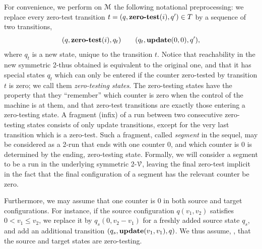 For convenience, we perform on $\mathcal{M}$ the following notational
preprocessing:
we replace every zero-test transition
$t=(q,\textbf{zero-test}(i), q')\in T$ by a sequence of two transitions,
\[
(q, \textbf{zero-test}(i), q_t) \qquad
(q_t, \textbf{update}(0,0), q'),
\]
where $q_t$ is a new state, unique to the transition $t$.
Notice that reachability in the new symmetric 2-\cm thus obtained 
is equivalent to the original one, 
and that it has special states $q_t$
which can only be entered if the counter zero-tested by 
transition $t$ is zero;
we call them \emph{zero-testing states}.
The zero-testing states have the property
that they ``remember'' which counter is zero 
when the control of the machine is at them,
and that zero-test transitions are exactly those entering
a zero-testing state.
A fragment (infix) of a run between two consecutive zero-testing
states consists of only update transitions, except for the very last
transition which is a zero-test.
Such a fragment, called \emph{segment} in the sequel,
may be considered as a 2-\vass run
that ends with one counter 0, and which counter is 0 is
determined by the ending, zero-testing state.
Formally, we will consider a segment to be a run in the
underlying symmetric 2-\vass $\mathcal{V}$,
leaving the final zero-test implicit in the fact
that the final configuration of a segment has the relevant
counter be zero.

\begin{remark} \label{rem:wlog}
Furthermore, \mywlog we may assume that one counter is 0
in both source and target configurations.
    For instance, if the source configuration $q(v_1, v_2)$ satisfies $0<v_1\leq v_2$,
    we replace it by $q_s(0,v_2-v_1)$ for a freshly added source state $q_s$,
    and add an additional transition $(q_s, \textbf{update}(v_1, v_1), q)$.
We thus assume, \mywlog, 
that the source and target states are zero-testing.
\end{remark}



